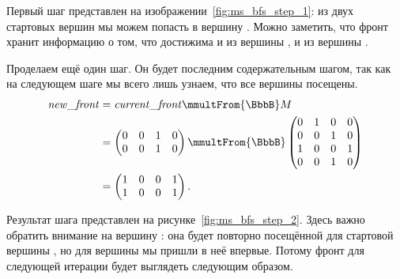 \begin{example}
    Первый шаг представлен на изображении~\ref{fig:ms_bfs_step_1}: из двух стартовых вершин мы можем попасть в вершину .
    Можно заметить, что фронт хранит информацию о том, что  достижима и из вершины , и из вершины .

    \begin{marginfigure}
        \begin{center}
            \resizebox{\marginparwidth}{!}{}
        \end{center}
        \caption{Обход в ширину с несколькими стартовыми вершинами, шаг второй}
        \label{fig:ms_bfs_step_2}
    \end{marginfigure}

    Проделаем ещё один шаг.
    Он будет последним содержательным шагом, так как на следующем шаге мы всего лишь узнаем, что все вершины посещены.
    \begin{align*}
        \mathit{new\_front} & = \mathit{current\_front} \mmultFrom{\BbbB} M \\
                          & =
        \begin{pmatrix}
            0 & 0 & 1 & 0 \\
            0 & 0 & 1 & 0
        \end{pmatrix} \mmultFrom{\BbbB}
        \begin{pmatrix}
            0 & 1 & 0 & 0 \\
            0 & 0 & 1 & 0 \\
            1 & 0 & 0 & 1 \\
            0 & 0 & 1 & 0
        \end{pmatrix}        \\ &=
        \begin{pmatrix}
            1 & 0 & 0 & 1 \\
            1 & 0 & 0 & 1
        \end{pmatrix}.
    \end{align*}



    Результат шага представлен на рисунке~\ref{fig:ms_bfs_step_2}.
    Здесь важно обратить внимание на вершину : она будет повторно посещённой для стартовой вершины , но для вершины  мы пришли в неё впервые.
    Потому фронт для следующей итерации будет выглядеть следующим образом.


\end{example}
